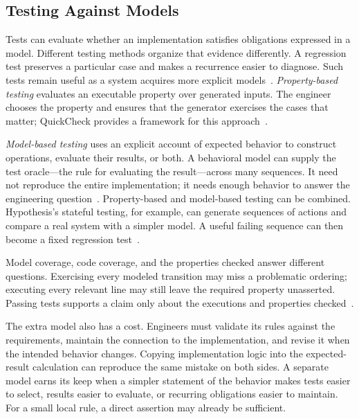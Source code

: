 \subsection{Testing Against Models}\label{heading:tests-and-models-work-together}


Tests can evaluate whether an implementation satisfies obligations expressed in a model. Different testing methods organize that evidence differently. A regression test preserves a particular case and makes a recurrence easier to diagnose. Such tests remain useful as a system acquires more explicit models~\citep{winters2020}. \emph{Property-based testing} evaluates an executable property over generated inputs. The engineer chooses the property and ensures that the generator exercises the cases that matter; QuickCheck provides a framework for this approach~\citep{claessen2000quickcheck}.

\emph{Model-based testing} uses an explicit account of expected behavior to construct operations, evaluate their results, or both. A behavioral model can supply the test oracle---the rule for evaluating the result---across many sequences. It need not reproduce the entire implementation; it needs enough behavior to answer the engineering question~\citep{utting2012taxonomy}. Property-based and model-based testing can be combined. Hypothesis's stateful testing, for example, can generate sequences of actions and compare a real system with a simpler model. A useful failing sequence can then become a fixed regression test~\citep{hypothesis-stateful}.

Model coverage, code coverage, and the properties checked answer different questions. Exercising every modeled transition may miss a problematic ordering; executing every relevant line may still leave the required property unasserted. Passing tests supports a claim only about the executions and properties checked~\citep{winters2020}.

The extra model also has a cost. Engineers must validate its rules against the requirements, maintain the connection to the implementation, and revise it when the intended behavior changes. Copying implementation logic into the expected-result calculation can reproduce the same mistake on both sides. A separate model earns its keep when a simpler statement of the behavior makes tests easier to select, results easier to evaluate, or recurring obligations easier to maintain. For a small local rule, a direct assertion may already be sufficient.

